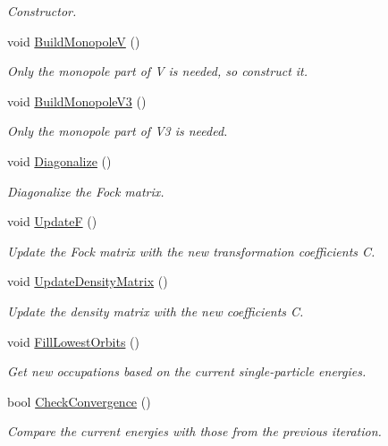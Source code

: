 \begin{DoxyCompactItemize}
\begin{DoxyCompactList}\small\item\em Constructor. \end{DoxyCompactList}\item 
void \hyperlink{classHartreeFock_a3d6bac9b4403e4bc599a89ad0c9b6056}{Build\+MonopoleV} ()
\begin{DoxyCompactList}\small\item\em Only the monopole part of V is needed, so construct it. \end{DoxyCompactList}\item 
void \hyperlink{classHartreeFock_a1c146af25a09f427cc626d877ec6e518}{Build\+Monopole\+V3} ()
\begin{DoxyCompactList}\small\item\em Only the monopole part of V3 is needed. \end{DoxyCompactList}\item 
void \hyperlink{classHartreeFock_a00f7b0c4cb7373a3f1a69ca27a4dfaed}{Diagonalize} ()
\begin{DoxyCompactList}\small\item\em Diagonalize the Fock matrix. \end{DoxyCompactList}\item 
void \hyperlink{classHartreeFock_a84fe0eb16f6e5835c920bf8fa98c4442}{UpdateF} ()
\begin{DoxyCompactList}\small\item\em Update the Fock matrix with the new transformation coefficients C. \end{DoxyCompactList}\item 
void \hyperlink{classHartreeFock_aad38c905e7e9f9e9757b5800e6910c61}{Update\+Density\+Matrix} ()
\begin{DoxyCompactList}\small\item\em Update the density matrix with the new coefficients C. \end{DoxyCompactList}\item 
void \hyperlink{classHartreeFock_a74c842cbf4e8caec72591c1205794f1f}{Fill\+Lowest\+Orbits} ()
\begin{DoxyCompactList}\small\item\em Get new occupations based on the current single-\/particle energies. \end{DoxyCompactList}\item 
bool \hyperlink{classHartreeFock_a35ab9c4f96e68b1c9acea1d1407ecc60}{Check\+Convergence} ()
\begin{DoxyCompactList}\small\item\em Compare the current energies with those from the previous iteration. \end{DoxyCompactList}\item 

\end{DoxyCompactItemize}
